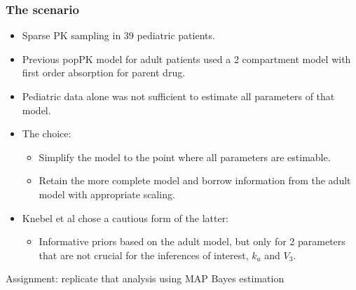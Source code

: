 \documentclass{beamer}
\begin{document}
\begin{frame}
  \frametitle{The scenario}

  \begin{itemize}
  \item Sparse PK sampling in 39 pediatric patients.
\item Previous popPK model for adult patients used a 2 compartment
  model with first order absorption for parent drug.
\item Pediatric data alone was not sufficient to estimate all
  parameters of that model.
\item The choice:
  \begin{itemize}
  \item Simplify the model to the point where all parameters are
    estimable.
\item Retain the more complete model and borrow information from the adult model with appropriate scaling.
  \end{itemize}
  \item Knebel et al chose a cautious form of the latter:
    \begin{itemize}
    \item Informative priors based on the adult model, but only for 2
      parameters that are not crucial for the inferences of interest,
      $k_a$ and $V_3$.
    \end{itemize}
  \end{itemize}

Assignment: replicate that analysis using MAP Bayes estimation

\end{frame}
\end{document}
